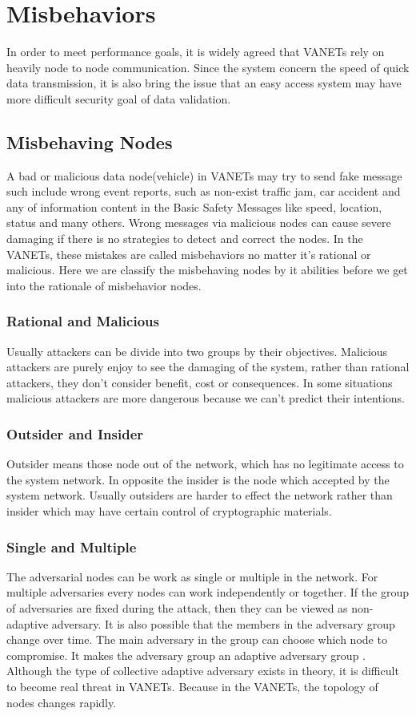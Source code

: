 \documentclass[conference]{IEEEtran}
\begin{document}
\section{Misbehaviors}
In order to meet performance goals, it is widely agreed that VANETs rely on heavily node to node communication. Since the system concern the speed of quick data transmission, it is also bring the issue that an easy access system may have more difficult security goal of data validation. \cite{NICE}
\subsection{Misbehaving Nodes}
A bad or malicious data node(vehicle) in VANETs may try to send fake message such include wrong event reports, such as non-exist traffic jam, car accident and any of information content in the Basic Safety Messages like speed, location, status and many others. Wrong messages via malicious nodes can cause severe damaging if there is no strategies to detect and correct the nodes. In the VANETs, these mistakes are called misbehaviors no matter it's rational or malicious. Here we are classify the misbehaving nodes by it abilities before we get into the rationale of misbehavior nodes.
\subsubsection{Rational and Malicious}
Usually attackers can be divide into two groups by their objectives. Malicious attackers are purely enjoy to see the damaging of the system, rather than rational attackers, they don't consider benefit, cost or consequences. In some situations malicious attackers are more dangerous  because we can't predict their intentions. \cite{40}
\subsubsection{Outsider and Insider}
Outsider means those node out of the network, which has no legitimate access to the system network. In opposite the insider is the node which accepted by the system network. Usually outsiders are harder to effect the network rather than insider which may have certain control of cryptographic materials.\cite{32} 
\subsubsection{Single and Multiple}
The adversarial nodes can be work as single or multiple in the network. For multiple adversaries every nodes can work independently or together. If the group of adversaries are fixed during the attack, then they can be viewed as non-adaptive adversary\cite{NICE}. It is also possible that the members in the adversary group change over time. The main adversary in the group can choose which node to compromise. It makes the adversary group an adaptive adversary group \cite{Sta}. Although the type of collective adaptive adversary exists in theory, it is difficult to become real threat in VANETs. Because in the VANETs, the topology of nodes changes rapidly.
\end{document}
